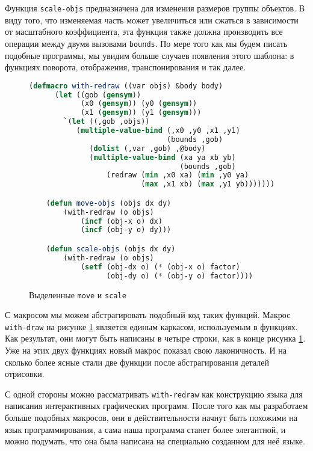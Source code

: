 \documentclass[12pt, a4paper]{article} %
\begin{document}
Функция \texttt{scale-objs} предназначена для изменения размеров группы объектов. В виду того, что изменяемая часть может увеличиться или сжаться в зависимости от масштабного коэффициента, эта функция также должна производить все операции между двумя вызовами \texttt{bounds}. По мере того как мы будем писать подобные программы, мы увидим больше случаев появления этого шаблона: в функциях поворота, отображения, транспонирования и так далее.
\begin{figure}[h]
\begin{lstlisting}[language=Lisp]
    (defmacro with-redraw ((var objs) &body body)
      (let ((gob (gensym))
            (x0 (gensym)) (y0 (gensym))
            (x1 (gensym)) (y1 (gensym)))
        `(let ((,gob ,objs))
           (multiple-value-bind (,x0 ,y0 ,x1 ,y1) 
                                (bounds ,gob)
              (dolist (,var ,gob) ,@body)
              (multiple-value-bind (xa ya xb yb) 
                                   (bounds ,gob)
                  (redraw (min ,x0 xa) (min ,y0 ya)
                          (max ,x1 xb) (max ,y1 yb)))))))

    (defun move-objs (objs dx dy)
        (with-redraw (o objs)
            (incf (obj-x o) dx)
            (incf (obj-y o) dy)))

    (defun scale-objs (objs dx dy)
        (with-redraw (o objs)
            (setf (obj-dx o) (* (obj-x o) factor)
                  (obj-dy o) (* (obj-y o) factor))))
\end{lstlisting}
\caption{Выделенные \texttt{move} и \texttt{scale}}
\label{fig:8-filleted-move-scale}
\end{figure}
\clearpage\newpage
С макросом мы можем абстрагировать подобный код таких функций. Макрос \texttt{with-draw} на рисунке \ref{fig:8-filleted-move-scale} является единым каркасом, используемым в функциях. Как результат, они могут быть написаны в четыре строки, как в конце рисунка \ref{fig:8-filleted-move-scale}. Уже на этих двух функциях новый макрос показал свою лаконичность. И на сколько более ясные стали две функции после абстрагирования деталей отрисовки.

С одной стороны можно рассматривать \texttt{with-redraw} как конструкцию языка для написания интерактивных графических программ. После того как мы разработаем больше подобных макросов, они в действительности начнут быть похожими на язык программирования, а сама наша программа станет более  элегантной, и можно подумать, что она была написана на специально созданном для неё языке.
\end{document}
